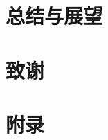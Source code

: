 \documentclass[oneside]{fduthesis}
\begin{document}
\chapter{总结与展望}


\backmatter

\printbibliography

\chapter{致\quad 谢}

\chapter{附\quad 录}
\end{document}
